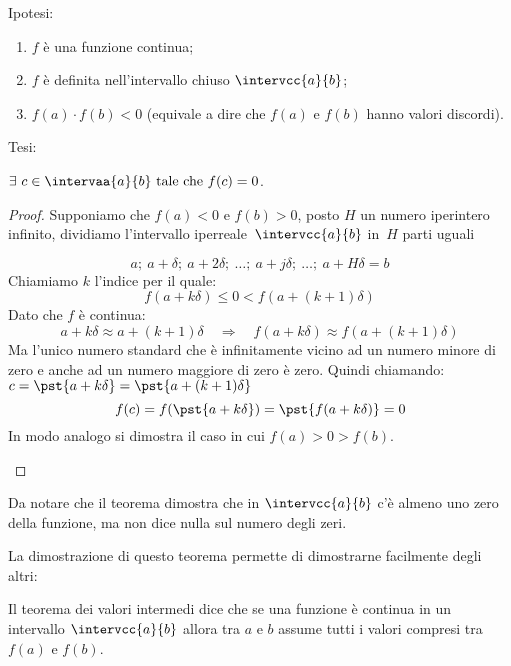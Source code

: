 \noindent Ipotesi: \nopagebreak
\begin{enumerate}[nosep]
 \item \(f\) è una funzione continua;
 \item \(f\) è definita nell'intervallo chiuso \(\intervcc{a}{b}\);
 \item \(f(a) \cdot f(b) < 0\) 
 (equivale a dire che \(f(a)\) e \(f(b)\) hanno valori discordi).
\end{enumerate}

\noindent Tesi: 

\(\exists~c \in \intervaa{a}{b} \text{ tale che } f(c)=0\).

\begin{proof}
Supponiamo che \(f(a)<0\) e \(f(b)>0\), posto \(H\) un numero iperintero 
infinito, dividiamo l'intervallo iperreale~\(\intervcc{a}{b}\) in~\(H\) 
parti uguali

\begin{minipage}{.58\textwidth}
\[a;~a+\delta;~a+2\delta;~\dots;~a+j\delta;~\dots;~a+H\delta=b\]
Chiamiamo \(k\) l'indice per il quale:
\[f(a+k\delta) \leqslant 0 < f(a+(k+1)\delta)\]
Dato che \(f\) è continua:
\[a+k\delta \approx a+(k+1)\delta \quad \Rightarrow \quad 
f(a+k\delta) \approx f(a+(k+1)\delta)\] 
Ma l'unico numero standard che è infinitamente vicino ad un numero
minore di zero e anche ad un numero maggiore di zero è zero. 
Quindi chiamando:\(c=\pst{a+k\delta}=\pst{a+(k+1)\delta}\)
\[f(c)=f(\pst{a+k\delta})=\pst{f(a+k\delta)}=0\]
In modo analogo si dimostra il caso in cui \(f(a)>0>f(b)\).
\end{minipage}
\hfill
\begin{minipage}{.38\textwidth}
\begin{center} \tzeri \end{center}
\end{minipage}

\end{proof}

Da notare che il teorema dimostra che in \(\intervcc{a}{b}\) c'è almeno uno 
zero della funzione, ma non dice nulla sul numero degli zeri.

La dimostrazione di questo teorema permette di dimostrarne facilmente degli 
altri: 

\begin{corollario}
Il teorema dei valori intermedi dice che se una funzione è continua in un
intervallo \(\intervcc{a}{b}\) allora tra \(a\) e \(b\) assume tutti i 
valori 
compresi tra \(f(a)\) e \(f(b)\).
\end{corollario}

